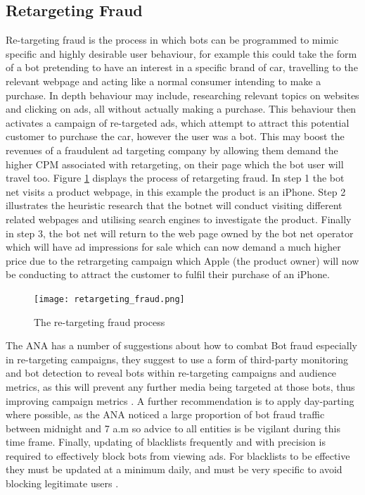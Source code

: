 \documentclass[12pt]{article}
\begin{document}
\subsection{Retargeting Fraud}
Re-targeting fraud is the process in which bots can be programmed to mimic specific and highly desirable user behaviour, for example this could take the form of a bot pretending to have an interest in a specific brand of car, travelling to the relevant webpage and acting like a normal consumer intending to make a purchase. In depth behaviour may include, researching relevant topics on websites and clicking on ads, all without actually making a purchase. This behaviour then activates a campaign of re-targeted ads, which attempt to attract this potential customer to purchase the car, however the user was a bot. This may boost the revenues of a fraudulent ad targeting company by allowing them demand the higher CPM associated with retargeting, on their page which the bot user will travel too. Figure \ref{fig:retargeting_fraud} displays the process of retargeting fraud. In step 1 the bot net visits a product webpage, in this example the product is an iPhone. Step 2 illustrates the heuristic research that the botnet will conduct visiting different related webpages and utilising search engines to investigate the product. Finally in step 3, the bot net will return to the web page owned by the bot net operator which will have ad impressions for sale which can now demand a much higher price due to the retrargeting campaign which Apple (the product owner) will now be conducting to attract the customer to fulfil their purchase of an iPhone.  \\

\begin{figure} [H]
    \centering
    \texttt{[image: retargeting\_fraud.png]}
    \caption{The re-targeting fraud process}
    \label{fig:retargeting_fraud}
\end{figure}

The ANA has a number of suggestions about how to combat Bot fraud especially in re-targeting campaigns, they suggest to use a form of third-party monitoring and bot detection to reveal bots within re-targeting campaigns and audience metrics, as this will prevent any further media being targeted at those bots, thus improving campaign metrics \parencite{botfraud2015}. A further recommendation is to apply day-parting where possible, as the ANA noticed a large proportion of bot fraud traffic between midnight and 7 a.m so advice to all entities is be vigilant during this time frame. Finally, updating of blacklists frequently and with precision is required to effectively block bots from viewing ads. For blacklists to be effective they must be updated at a minimum daily, and must be very specific to avoid blocking legitimate users \parencite{botfraud2015}.  
\end{document}
